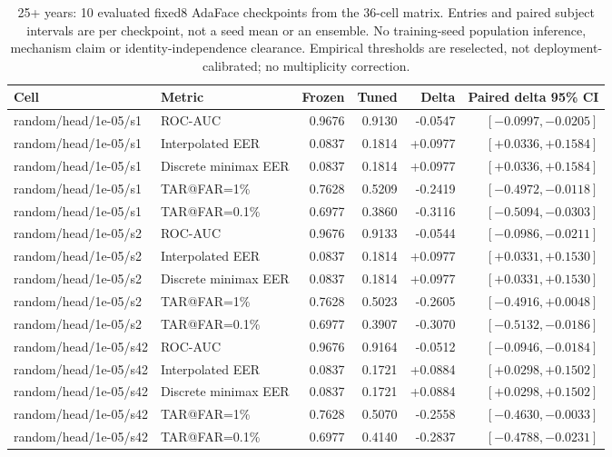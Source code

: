 \begin{table}[!t]
\caption{25+ years: 10 evaluated fixed8 AdaFace checkpoints from the 36-cell matrix. Entries and paired subject intervals are per checkpoint, not a seed mean or an ensemble. No training-seed population inference, mechanism claim or identity-independence clearance. Empirical thresholds are reselected, not deployment-calibrated; no multiplicity correction.}
\label{tab:strong-fixed8-large-gap-25plus}
\centering\scriptsize
\begin{tabular}{@{}llrrrr@{}}
\toprule
Cell & Metric & Frozen & Tuned & Delta & Paired delta 95\% CI \\
\midrule
random/head/1e-05/s1 & ROC-AUC & 0.9676 & 0.9130 & -0.0547 & $[-0.0997,-0.0205]$ \\
random/head/1e-05/s1 & Interpolated EER & 0.0837 & 0.1814 & +0.0977 & $[+0.0336,+0.1584]$ \\
random/head/1e-05/s1 & Discrete minimax EER & 0.0837 & 0.1814 & +0.0977 & $[+0.0336,+0.1584]$ \\
random/head/1e-05/s1 & TAR@FAR=1\% & 0.7628 & 0.5209 & -0.2419 & $[-0.4972,-0.0118]$ \\
random/head/1e-05/s1 & TAR@FAR=0.1\% & 0.6977 & 0.3860 & -0.3116 & $[-0.5094,-0.0303]$ \\
random/head/1e-05/s2 & ROC-AUC & 0.9676 & 0.9133 & -0.0544 & $[-0.0986,-0.0211]$ \\
random/head/1e-05/s2 & Interpolated EER & 0.0837 & 0.1814 & +0.0977 & $[+0.0331,+0.1530]$ \\
random/head/1e-05/s2 & Discrete minimax EER & 0.0837 & 0.1814 & +0.0977 & $[+0.0331,+0.1530]$ \\
random/head/1e-05/s2 & TAR@FAR=1\% & 0.7628 & 0.5023 & -0.2605 & $[-0.4916,+0.0048]$ \\
random/head/1e-05/s2 & TAR@FAR=0.1\% & 0.6977 & 0.3907 & -0.3070 & $[-0.5132,-0.0186]$ \\
random/head/1e-05/s42 & ROC-AUC & 0.9676 & 0.9164 & -0.0512 & $[-0.0946,-0.0184]$ \\
random/head/1e-05/s42 & Interpolated EER & 0.0837 & 0.1721 & +0.0884 & $[+0.0298,+0.1502]$ \\
random/head/1e-05/s42 & Discrete minimax EER & 0.0837 & 0.1721 & +0.0884 & $[+0.0298,+0.1502]$ \\
random/head/1e-05/s42 & TAR@FAR=1\% & 0.7628 & 0.5070 & -0.2558 & $[-0.4630,-0.0033]$ \\
random/head/1e-05/s42 & TAR@FAR=0.1\% & 0.6977 & 0.4140 & -0.2837 & $[-0.4788,-0.0231]$ \\

\end{tabular}
\end{table}
